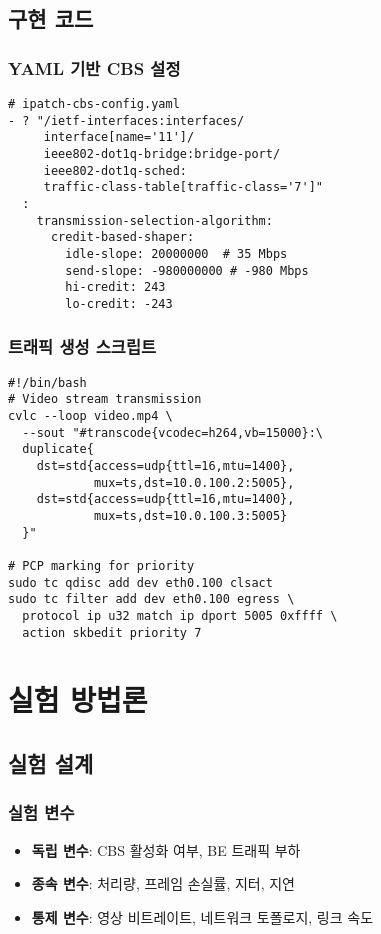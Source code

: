 \documentclass[10pt,twocolumn]{IEEEtran}
\begin{document}
\subsection{구현 코드}

\subsubsection{YAML 기반 CBS 설정}
\begin{verbatim}
# ipatch-cbs-config.yaml
- ? "/ietf-interfaces:interfaces/
     interface[name='11']/
     ieee802-dot1q-bridge:bridge-port/
     ieee802-dot1q-sched:
     traffic-class-table[traffic-class='7']"
  : 
    transmission-selection-algorithm:
      credit-based-shaper:
        idle-slope: 20000000  # 35 Mbps
        send-slope: -980000000 # -980 Mbps
        hi-credit: 243
        lo-credit: -243
\end{verbatim}

\subsubsection{트래픽 생성 스크립트}
\begin{verbatim}
#!/bin/bash
# Video stream transmission
cvlc --loop video.mp4 \
  --sout "#transcode{vcodec=h264,vb=15000}:\
  duplicate{
    dst=std{access=udp{ttl=16,mtu=1400},
            mux=ts,dst=10.0.100.2:5005},
    dst=std{access=udp{ttl=16,mtu=1400},
            mux=ts,dst=10.0.100.3:5005}
  }"

# PCP marking for priority
sudo tc qdisc add dev eth0.100 clsact
sudo tc filter add dev eth0.100 egress \
  protocol ip u32 match ip dport 5005 0xffff \
  action skbedit priority 7
\end{verbatim}

\section{실험 방법론}

\subsection{실험 설계}

\subsubsection{실험 변수}
\begin{itemize}
\item \textbf{독립 변수}: CBS 활성화 여부, BE 트래픽 부하
\item \textbf{종속 변수}: 처리량, 프레임 손실률, 지터, 지연
\item \textbf{통제 변수}: 영상 비트레이트, 네트워크 토폴로지, 링크 속도
\end{itemize}
\end{document}

